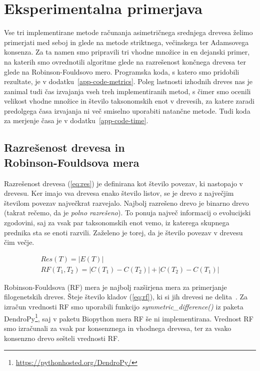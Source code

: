 \documentclass[a4paper, 12pt]{book}
\begin{document}
\chapter{Eksperimentalna primerjava}

Vse tri implementirane metode računanja asimetričnega srednjega drevesa želimo 
primerjati med seboj in glede na metode striktnega, večinskega ter Adamsovega 
konsenza. Za ta namen smo pripravili tri vhodne množice in en dejanski primer,
na katerih smo ovrednotili algoritme glede na razrešenost končnega drevesa ter 
glede na Robinson-Fouldsovo mero. 
Programska koda, s katero smo pridobili rezultate, je v 
dodatku~\ref{app-code-metrics}. Poleg lastnosti izhodnih dreves nas je zanimal 
tudi čas izvajanja vseh treh implementiranih metod, s čimer smo ocenili velikost 
vhodne množice in število taksonomskih enot v drevesih, za katere zaradi 
predolgega časa izvajanja ni več smiselno uporabiti  natančne metode. Tudi koda za 
merjenje časa je v dodatku~\ref{app-code-time}.


\section[Razrešenost drevesa in Robinson-Fouldsova mera]{Razrešenost drevesa in\\ Robinson-Fouldsova mera}
Razrešenost drevesa (\ref{eq:res}) je definirana kot število povezav, ki 
nastopajo v drevesu. Ker imajo vsa drevesa enako število listov, se je drevo z 
največjim številom povezav največkrat razvejalo. Najbolj razrešeno drevo je 
binarno drevo (takrat rečemo, da je {\it polno razrešeno}). To ponuja največ 
informacij o evolucijski zgodovini, saj za vsak par taksonomskih enot vemo, 
iz katerega skupnega prednika sta se enoti razvili. Zaželeno je torej, da 
je število povezav v drevesu čim večje.

\begin{align}
	Res(T) = \left|E(T)\right| \label{eq:res} ~~~~~~~~~~~~~~~~~~~~~ \\
	RF(T_1, T_2) = \left|C(T_1) - C(T_2)\right| + \left|C(T_2) - C(T_1)\right|  \label{eq:rf}
\end{align}

\noindent Robinson-Fouldsova (RF) mera je najbolj razširjena mera za primerjanje 
filogenetskih dreves. Šteje število kladov (\ref{eq:rf}), ki si jih drevesi 
ne delita~\cite{rf}. Za izračun vrednosti RF smo uporabili funkcijo 
{\it symmetric\_difference()} iz paketa 
DendroPy\footnote{\url{https://pythonhosted.org/DendroPy/}}, saj v paketu 
Biopython mera RF še ni implementirana. Vrednost RF smo izračunali za 
vsak par konsenznega in vhodnega drevesa, ter za vsako konsenzno drevo sešteli
vrednosti RF.
\end{document}

